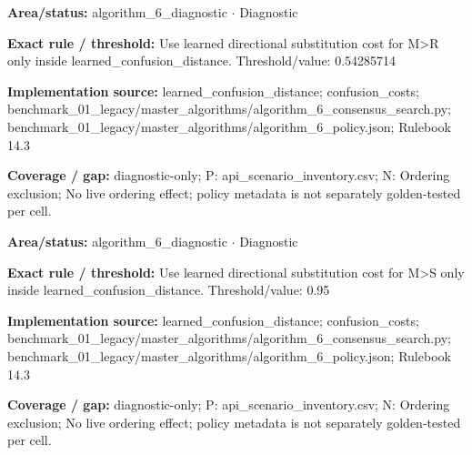 \begin{tcolorbox}[enhanced,breakable,colback=white,colframe=Muted!45,boxrule=0.45pt,arc=1.5pt,left=6pt,right=6pt,top=5pt,bottom=5pt,title={\texttt{A6-LEARNED-SUBSTITUTION-M-R}},title after break={\texttt{A6-LEARNED-SUBSTITUTION-M-R}\ (continued)},fonttitle=\headingfont\bfseries\color{Navy},coltitle=Navy]
\textbf{Area/status:} algorithm\_\allowbreak{}6\_\allowbreak{}diagnostic $\boldsymbol{\cdot}$ Diagnostic\par
\smallskip
\textbf{Exact rule / threshold:} Use learned directional substitution cost for M>R only inside learned\_\allowbreak{}confusion\_\allowbreak{}distance. Threshold/\allowbreak{}value: 0.54285714\par
\smallskip
\textbf{Implementation source:} learned\_\allowbreak{}confusion\_\allowbreak{}distance; confusion\_\allowbreak{}costs; benchmark\_\allowbreak{}01\_\allowbreak{}legacy/\allowbreak{}master\_\allowbreak{}algorithms/\allowbreak{}algorithm\_\allowbreak{}6\_\allowbreak{}consensus\_\allowbreak{}search.py; benchmark\_\allowbreak{}01\_\allowbreak{}legacy/\allowbreak{}master\_\allowbreak{}algorithms/\allowbreak{}algorithm\_\allowbreak{}6\_\allowbreak{}policy.json; Rulebook 14.3\par
\smallskip
\textbf{Coverage / gap:} diagnostic-only; P: api\_\allowbreak{}scenario\_\allowbreak{}inventory.csv; N: Ordering exclusion; No live ordering effect; policy metadata is not separately golden-tested per cell.
\end{tcolorbox}
\begin{tcolorbox}[enhanced,breakable,colback=white,colframe=Muted!45,boxrule=0.45pt,arc=1.5pt,left=6pt,right=6pt,top=5pt,bottom=5pt,title={\texttt{A6-LEARNED-SUBSTITUTION-M-S}},title after break={\texttt{A6-LEARNED-SUBSTITUTION-M-S}\ (continued)},fonttitle=\headingfont\bfseries\color{Navy},coltitle=Navy]
\textbf{Area/status:} algorithm\_\allowbreak{}6\_\allowbreak{}diagnostic $\boldsymbol{\cdot}$ Diagnostic\par
\smallskip
\textbf{Exact rule / threshold:} Use learned directional substitution cost for M>S only inside learned\_\allowbreak{}confusion\_\allowbreak{}distance. Threshold/\allowbreak{}value: 0.95\par
\smallskip
\textbf{Implementation source:} learned\_\allowbreak{}confusion\_\allowbreak{}distance; confusion\_\allowbreak{}costs; benchmark\_\allowbreak{}01\_\allowbreak{}legacy/\allowbreak{}master\_\allowbreak{}algorithms/\allowbreak{}algorithm\_\allowbreak{}6\_\allowbreak{}consensus\_\allowbreak{}search.py; benchmark\_\allowbreak{}01\_\allowbreak{}legacy/\allowbreak{}master\_\allowbreak{}algorithms/\allowbreak{}algorithm\_\allowbreak{}6\_\allowbreak{}policy.json; Rulebook 14.3\par
\smallskip
\textbf{Coverage / gap:} diagnostic-only; P: api\_\allowbreak{}scenario\_\allowbreak{}inventory.csv; N: Ordering exclusion; No live ordering effect; policy metadata is not separately golden-tested per cell.
\end{tcolorbox}
